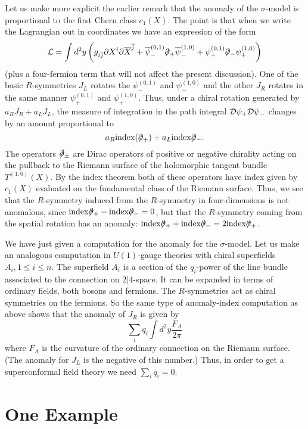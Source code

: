 Let us make more explicit the earlier remark that the anomaly of the
$\sigma$-model is
proportional to the first Chern class $c_1(X)$. The point is that when
we write the Lagrangian out in coordinates we have an expression of
the form
$${\cal L}=\int d^2y\left(g_{i\overline j}\partial X^i\partial
\overline X^{\overline
j}+\overline\psi_-^{(0,1)}\dirac_+\overline\psi_-^{(1,0)}+
\psi_+^{(0,1)}\dirac_-\psi_+^{(1,0)}\right)$$
(plus a four-fermion term that will not affect the present discussion).
One of the  basic $R$-symmetries $J_L$ rotates the $\psi_-^{(0,1)}$ and
$\psi_-^{(1,0)}$  and the other $J_R$ rotates in the same manner
$\psi_+^{(0,1)}$ and $\psi_+^{(1,0)}$. Thus, under a chiral
rotation generated by $a_RJ_R+a_LJ_L$,
 the measure of integration in the path integral ${\cal
D}\psi_+{\cal D}\psi_-$ changes by an amount proportional to
$$a_R{\rm index}(\dirac_+)+a_L{\rm index}\dirac_-.$$
The  operators $\dirac_\pm$ are Dirac operators of positive or negative
chirality acting on the pullback to the Riemann surface of the holomorphic
tangent bundle $T^{(1,0)}(X)$.
By the index theorem both of these operators
have index given by $c_1(X)$ evaluated on the fundamental class of
the Riemann surface.
Thus, we see that the $R$-symmetry induced from the $R$-symmetry in
four-dimensions is not anomalous, since
${\rm index}\dirac_+-{\rm index}\dirac_-=0$,
but that the $R$-symmetry coming
from the spatial rotation has an anomaly:
${\rm index}\dirac_++{\rm index}\dirac_-=2{\rm index}\dirac_+$.

We have just given a computation for the anomaly for the
$\sigma$-model. Let us make an analogous computation in $U(1)$-gauge
theories with chiral superfields $A_i, 1\le i\le n$.
The superfield $A_i$ is a section of
the $q_i$-power of the line bundle associated to the connection on
$2|4$-space.   It can be expanded in terms of ordinary fields, both
bosons and fermions.
The $R$-symmetries act as chiral symmetries on the fermions.  So the
same type of  anomaly-index computation as above shows that the
anomaly of $J_R$ is given by
$$\sum_{i}q_i\int d^2y\frac{F_A}{2\pi}$$
where $F_A$ is the curvature of the ordinary connection on the Riemann
surface.
(The anomaly for $J_L$ is the negative of this number.)
Thus, in order to get a superconformal field theory we need
$\sum_iq_i=0$.


\section{One Example}

